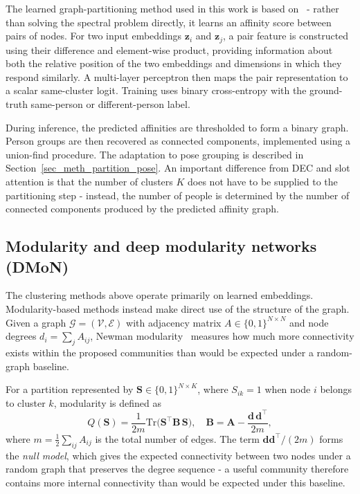 The learned graph-partitioning method used in this work is based on~\cite{yang2020gcnve} -
rather than solving the spectral problem directly,
it learns an affinity score between pairs of nodes.
For two input embeddings $\mathbf{z}_i$ and $\mathbf{z}_j$,
a pair feature is constructed using their difference and element-wise product,
providing information about both the relative position of the two embeddings
and dimensions in which they respond similarly.
A multi-layer perceptron then maps the pair representation to a scalar same-cluster logit.
Training uses binary cross-entropy with the ground-truth same-person or different-person label.

During inference, the predicted affinities are thresholded to form a binary graph.
Person groups are then recovered as connected components, implemented using a union-find procedure.
The adaptation to pose grouping is described in Section~\ref{sec_meth_partition_pose}.
An important difference from DEC and slot attention
is that the number of clusters $K$ does not have to be supplied to the partitioning step -
instead, the number of people is determined
by the number of connected components produced by the predicted affinity graph.

\subsection{Modularity and deep modularity networks (DMoN)}
\label{sec_meth_dmon_prelim}

The clustering methods above operate primarily on learned embeddings.
Modularity-based methods instead make direct use of the structure of the graph.
Given a graph $\mathcal{G} = (\mathcal{V}, \mathcal{E})$ with adjacency matrix $A \in \{0,1\}^{N \times N}$
and node degrees $d_i = \sum_j A_{ij}$,
Newman modularity~\cite{newman2006modularity} measures how much more connectivity exists
within the proposed communities than would be expected under a random-graph baseline.

For a partition represented by $\mathbf{S} \in \{0,1\}^{N \times K}$,
where $S_{ik}=1$ when node $i$ belongs to cluster $k$,
modularity is defined as
\begin{equation}
    Q(\mathbf{S})
    = \frac{1}{2m}
      \mathrm{Tr}\bigl(\mathbf{S}^{\top} \mathbf{B}\, \mathbf{S}\bigr),
    \quad
    \mathbf{B}
    = \mathbf{A}
      - \frac{\mathbf{d}\,\mathbf{d}^{\top}}{2m},
    \label{eq:newman_modularity}
\end{equation}
where $m = \tfrac{1}{2}\sum_{ij} A_{ij}$ is the total number of edges.
The term $\mathbf{d}\mathbf{d}^{\top}/(2m)$ forms the \emph{null model},
which gives the expected connectivity between two nodes under a random graph that preserves the degree sequence -
a useful community therefore contains more internal connectivity than would be expected under this baseline.

